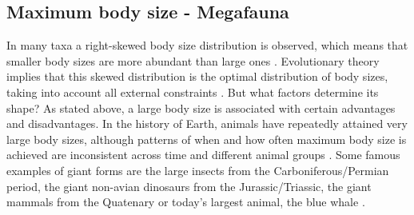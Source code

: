 \subsection{Maximum body size - Megafauna}
In many taxa a right-skewed body size distribution is observed, which means that smaller body sizes are more abundant than large ones \citep{Blackburn1994a,Kozlowski2002,Lyons2008}. 
Evolutionary theory implies that this skewed distribution is the optimal distribution of body sizes, taking into account all external constraints \citep{Smith2009}. But what factors determine its shape?
As stated above, a large body size is associated with certain advantages and disadvantages.
In the history of Earth, animals have repeatedly attained very large body sizes, although patterns of when and how often maximum body size is achieved are inconsistent across time and different animal groups \citep{Smith2016}.
Some famous examples of giant forms are the large insects from the Carboniferous/Permian period, the giant non-avian dinosaurs from the Jurassic/Triassic, the giant mammals from the Quatenary or today's largest animal, the blue whale \citep{.}.

